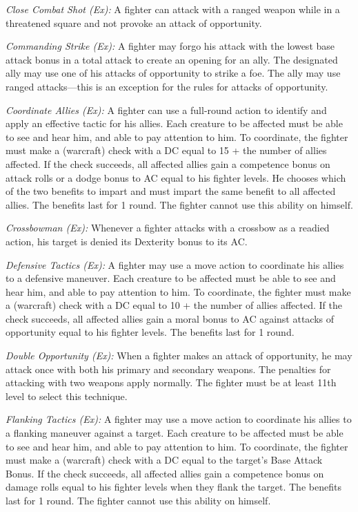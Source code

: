 \textit{Close Combat Shot (Ex):} A fighter can attack with a ranged weapon while in a threatened square and not provoke an attack of opportunity.

\textit{Commanding Strike (Ex):} A fighter may forgo his attack with the lowest base attack bonus in a total attack to create an opening for an ally. The designated ally may use one of his attacks of opportunity to strike a foe. The ally may use ranged attacks---this is an exception for the rules for attacks of opportunity.

\textit{Coordinate Allies (Ex):} A fighter can use a full-round action to identify and apply an effective tactic for his allies. Each creature to be affected must be able to see and hear him, and able to pay attention to him. To coordinate, the fighter must make a  (warcraft) check with a DC equal to 15 + the number of allies affected. If the check succeeds, all affected allies gain a competence bonus on attack rolls or a dodge bonus to AC equal to \onequarter his fighter levels. He chooses which of the two benefits to impart and must impart the same benefit to all affected allies. The benefits last for 1 round. The fighter cannot use this ability on himself.

\textit{Crossbowman (Ex):} Whenever a fighter attacks with a crossbow as a readied action, his target is denied its Dexterity bonus to its AC.

\textit{Defensive Tactics (Ex):} A fighter may use a move action to coordinate his allies to a defensive maneuver. Each creature to be affected must be able to see and hear him, and able to pay attention to him. To coordinate, the fighter must make a  (warcraft) check with a DC equal to 10 + the number of allies affected. If the check succeeds, all affected allies gain a moral bonus to AC against attacks of opportunity equal to \onequarter his fighter levels. The benefits last for 1 round.

\textit{Double Opportunity (Ex):} When a fighter makes an attack of opportunity, he may attack once with both his primary and secondary weapons. The penalties for attacking with two weapons apply normally. The fighter must be at least 11th level to select this technique.

\textit{Flanking Tactics (Ex):} A fighter may use a move action to coordinate his allies to a flanking maneuver against a target. Each creature to be affected must be able to see and hear him, and able to pay attention to him. To coordinate, the fighter must make a  (warcraft) check with a DC equal to the target's Base Attack Bonus. If the check succeeds, all affected allies gain a competence bonus on damage rolls equal to \onequarter his fighter levels when they flank the target. The benefits last for 1 round. The fighter cannot use this ability on himself.

